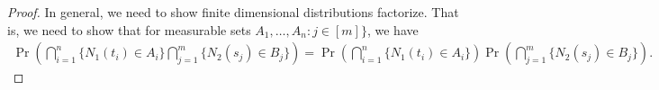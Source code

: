 \documentclass[a4paper,10pt,english]{article}
\begin{document}
\begin{proof}
In general, we need to show finite dimensional distributions factorize. That is, we need to show that for measurable sets $A_1, \hdots, A_n: j \in [m]\}$, we have \begin{align*}
   \Pr\left(\bigcap_{i=1}^n\{N_{1}(t_{i})\in A_{i}\}\bigcap_{j=1}^m\{N_{2}(s_{j})\in B_{j}\}\right)
   =\Pr\left(\bigcap_{i=1}^n\{N_{1}(t_{i})\in A_{i}\}\right)\Pr\left(\bigcap_{j=1}^m\{N_{2}(s_{j})\in B_{j}\}\right).
\end{align*}
\end{proof}
\end{document}
